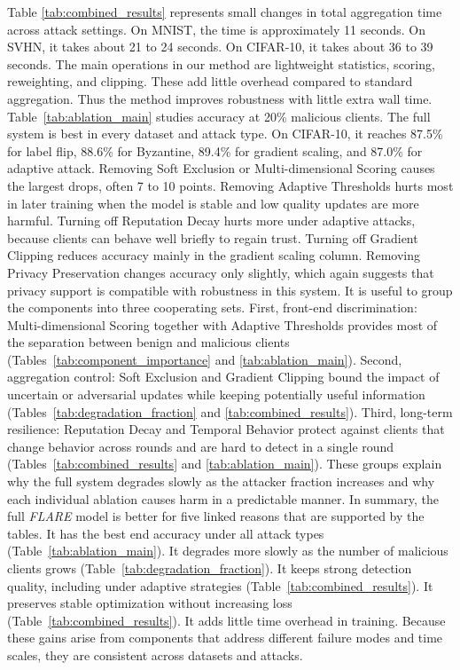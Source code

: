 \documentclass[lettersize,journal]{IEEEtran}
\begin{document}
{Table \ref{tab:combined_results} represents small changes in total aggregation time across attack settings. On MNIST, the time is approximately 11 seconds. On SVHN, it takes about 21 to 24 seconds. On CIFAR-10, it takes about 36 to 39 seconds. The main operations in our method are lightweight statistics, scoring, reweighting, and clipping. These add little overhead compared to standard aggregation. Thus the method improves robustness with little extra wall time.
Table~\ref{tab:ablation_main} studies accuracy at 20\% malicious clients. The full system is best in every dataset and attack type. On CIFAR-10, it reaches 87.5\% for label flip, 88.6\% for Byzantine, 89.4\% for gradient scaling, and 87.0\% for adaptive attack. Removing Soft Exclusion or Multi-dimensional Scoring causes the largest drops, often 7 to 10 points. Removing Adaptive Thresholds hurts most in later training when the model is stable and low quality updates are more harmful. Turning off Reputation Decay hurts more under adaptive attacks, because clients can behave well briefly to regain trust. Turning off Gradient Clipping reduces accuracy mainly in the gradient scaling column. Removing Privacy Preservation changes accuracy only slightly, which again suggests that privacy support is compatible with robustness in this system.
It is useful to group the components into three cooperating sets. First, front-end discrimination: Multi-dimensional Scoring together with Adaptive Thresholds provides most of the separation between benign and malicious clients (Tables~\ref{tab:component_importance} and \ref{tab:ablation_main}). Second, aggregation control: Soft Exclusion and Gradient Clipping bound the impact of uncertain or adversarial updates while keeping potentially useful information (Tables~\ref{tab:degradation_fraction} and \ref{tab:combined_results}). Third, long-term resilience: Reputation Decay and Temporal Behavior protect against clients that change behavior across rounds and are hard to detect in a single round (Tables~\ref{tab:combined_results} and \ref{tab:ablation_main}). These groups explain why the full system degrades slowly as the attacker fraction increases and why each individual ablation causes harm in a predictable manner.
In summary, the full \textit{FLARE} model is better for five linked reasons that are supported by the tables. It has the best end accuracy under all attack types (Table~\ref{tab:ablation_main}). It degrades more slowly as the number of malicious clients grows (Table~\ref{tab:degradation_fraction}). It keeps strong detection quality, including under adaptive strategies (Table~\ref{tab:combined_results}). It preserves stable optimization without increasing loss (Table~\ref{tab:combined_results}). It adds little time overhead in training. Because these gains arise from components that address different failure modes and time scales, they are consistent across datasets and attacks.

}
\end{document}
